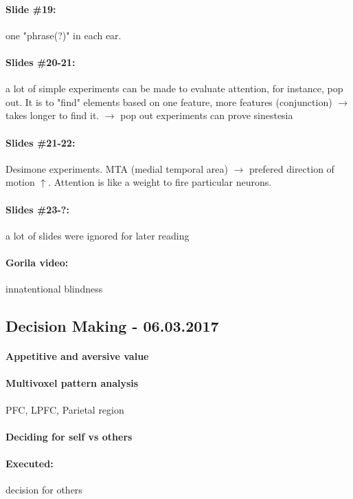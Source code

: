 \documentclass[12pt,article,oneside,a4paper]{memoir}
\begin{document}
\paragraph{Slide \#19:} one "phrase(?)" in each ear.
\paragraph{Slides \#20-21:} a lot of simple experiments can be made to evaluate attention, for instance, pop out. It is to "find" elements based on one feature, more features (conjunction) $\rightarrow$ takes longer to find it. $\rightarrow$ pop out experiments can prove sinestesia
\paragraph{Slides \#21-22:} Desimone experiments. MTA (medial temporal area) $\rightarrow$ prefered direction of motion $\uparrow$. Attention is like a weight to fire particular neurons.
\paragraph{Slides \#23-?:} a lot of slides were ignored for later reading
\paragraph{Gorila video:} innatentional blindness

\subsection{Decision Making - 06.03.2017}

\paragraph{Appetitive and aversive value}
\paragraph{Multivoxel pattern analysis} PFC, LPFC, Parietal region
\paragraph{Deciding for self vs others}
\paragraph{Executed:} decision for others
\end{document}
